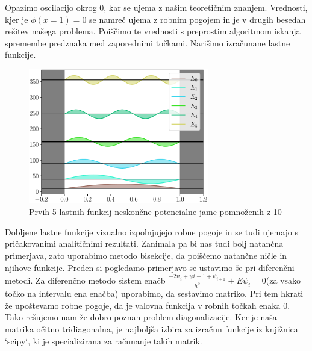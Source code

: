 \documentclass{article}
\begin{document}
Opazimo oscilacijo okrog 0, kar se ujema z našim teoretičnim znanjem. Vrednosti, kjer je $\phi(x=1) = 0$ se namreč ujema z robnim pogojem in je v drugih besedah rešitev našega problema. Poiščimo te vrednosti s preprostim algoritmom iskanja spremembe predznaka med zaporednimi točkami. Narišimo izračunane lastne funkcije.
\begin{figure}[H]
	\centering
	\includegraphics[width=0.7\textwidth]{eigen.pdf}
	\caption{Prvih 5 lastnih funkcij neskončne potencialne jame pomnoženih z 10}
\end{figure}
Dobljene lastne funkcije vizualno izpolnjujejo robne pogoje in se tudi ujemajo s pričakovanimi analitičnimi rezultati. Zanimala pa bi nas tudi bolj natančna primerjava, zato uporabimo metodo bisekcije, da poiščemo natančne ničle in njihove funkcije. Preden si pogledamo primerjavo se ustavimo še pri diferenčni metodi. 
Za diferenčno metodo sistem enačb $\frac{-2 \psi_i + \psi{i-1} + \psi_{i+1}}{h^2} + E\psi_{i} = 0$(za vsako točko na intervalu ena enačba) uporabimo, da sestavimo matriko. Pri tem hkrati že upoštevamo robne pogoje, da je valovna funkcija v robnih točkah enaka 0. Tako rešujemo nam že dobro poznan problem diagonalizacije. Ker je naša matrika očitno tridiagonalna, je najboljša izbira za izračun funkcije iz knjižnica `scipy`, ki je specializirana za računanje takih matrik.
\end{document}
